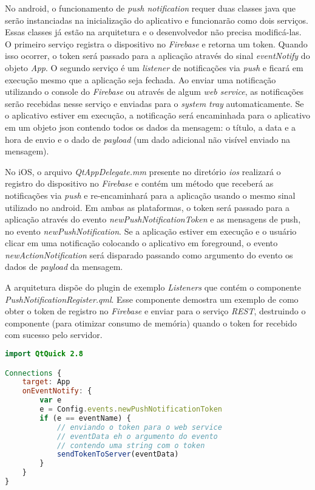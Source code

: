 No android, o funcionamento de \textit{push notification} requer duas classes java que serão instanciadas na inicialização do aplicativo e funcionarão como dois serviços. Essas classes já estão na arquitetura e o desenvolvedor não precisa modificá-las. O primeiro serviço registra o dispositivo no \textit{Firebase} e retorna um token. Quando isso ocorrer, o token será passado para a aplicação através do sinal \textit{eventNotify} do objeto \textit{App}. O segundo serviço é um \textit{listener} de notificações via \textit{push} e ficará em execução mesmo que a aplicação seja fechada. Ao enviar uma notificação utilizando o console do \textit{Firebase} ou através de algum \textit{web service}, as notificações serão recebidas nesse serviço e enviadas para o \textit{system tray} automaticamente. Se o aplicativo estiver em execução, a notificação será encaminhada para o aplicativo em um objeto json contendo todos os dados da mensagem: o título, a data e a hora de envio e o dado de \textit{payload} (um dado adicional não visível enviado na mensagem).\par

No iOS, o arquivo \textit{QtAppDelegate.mm} presente no diretório \textit{ios} realizará o registro do dispositivo no \textit{Firebase} e contém um método que receberá as notificações via \textit{push} e re-encaminhará para a aplicação usando o mesmo sinal utilizado no android. Em ambas as plataformas, o token será passado para a aplicação através do evento \textit{newPushNotificationToken} e as mensagens de push, no evento \textit{newPushNotification}. Se a aplicação estiver em execução e o usuário clicar em uma notificação colocando o aplicativo em foreground, o evento \textit{newActionNotification} será disparado passando como argumento do evento os dados de \textit{payload} da mensagem.\par

A arquitetura dispõe do plugin de exemplo \textit{Listeners} que contém o componente \textit{PushNotificationRegister.qml}. Esse componente demostra um exemplo de como obter o token de registro no \textit{Firebase} e enviar para o serviço \textit{REST}, destruindo o componente (para otimizar consumo de memória) quando o token for recebido com sucesso pelo servidor.

\begin{center}
\begin{lstlisting}[language=qml]
import QtQuick 2.8

Connections {
    target: App
    onEventNotify: {
		var e
		e = Config.events.newPushNotificationToken
		if (e == eventName) {
			// enviando o token para o web service
			// eventData eh o argumento do evento
			// contendo uma string com o token
			sendTokenToServer(eventData)
		}
	}
}
\end{lstlisting}
\end{center}

